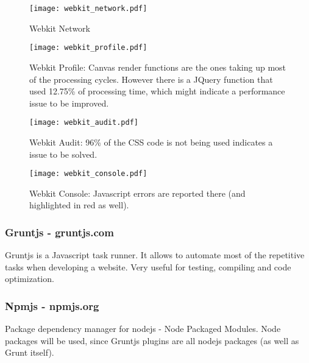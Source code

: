       \begin{figure}
        \begin{center}
          \texttt{[image: webkit\_network.pdf]}
        \end{center}
        \caption{Webkit Network}
        \label{fig:webkit_network}
      \end{figure}

      \begin{figure}
        \begin{center}
          \texttt{[image: webkit\_profile.pdf]}
        \end{center}
        \caption{Webkit Profile: Canvas render functions are the ones taking up most of the processing cycles. However there is a JQuery function that used 12.75\% of processing time, which might indicate a performance issue to be improved.}
        \label{fig:webkit_profile}
      \end{figure}

      \begin{figure}
        \begin{center}
          \texttt{[image: webkit\_audit.pdf]}
        \end{center}
        \caption{Webkit Audit: 96\% of the CSS code is not being used indicates a issue to be solved.}
        \label{fig:webkit_audit}
      \end{figure}

      \begin{figure}
        \begin{center}
          \texttt{[image: webkit\_console.pdf]}
        \end{center}
        \caption{Webkit Console: Javascript errors are reported there (and highlighted in red as well).}
        \label{fig:webkit_console}
      \end{figure}

    \subsubsection{Gruntjs - gruntjs.com} %
      \label{ssub:gruntjs}
        Gruntjs is a Javascript task runner.
        It allows to automate most of the repetitive tasks when developing a website.
        Very useful for testing, compiling and code optimization.

    \subsubsection{Npmjs - npmjs.org} %
    \label{ssub:npm}
      Package dependency manager for nodejs - Node Packaged Modules.
      Node packages will be used, since Gruntjs plugins are all nodejs packages (as well as Grunt itself).


